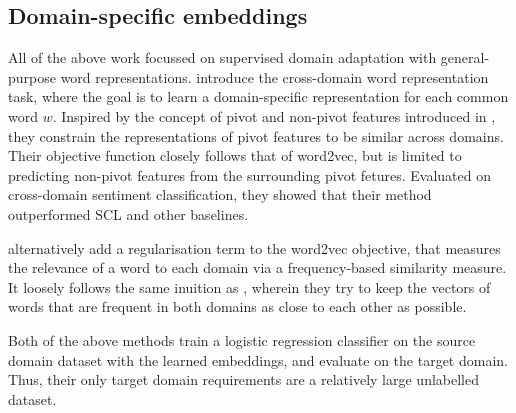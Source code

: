 \documentclass[12pt]{report}
\begin{document}
	\subsection{Domain-specific embeddings}
	All of the above work focussed on supervised domain adaptation with general-purpose word representations. \citep{bollegala2015unsupervised} introduce the cross-domain word representation task, where the goal is to learn a domain-specific representation for each common word $w$. Inspired by the concept of pivot and non-pivot features introduced in \citep{blitzer2006domain}, they constrain the representations of pivot features to be similar across domains. Their objective function closely follows that of word2vec, but is limited to predicting non-pivot features from the surrounding pivot fetures. Evaluated on cross-domain sentiment classification, they showed that their method outperformed SCL and other baselines. 
	\par \citep{yang2017simple} alternatively add a regularisation term to  the word2vec objective, that measures the relevance of a word to each domain via a frequency-based similarity measure. It loosely follows the same inuition as \citep{bollegala2015unsupervised}, wherein they try to keep the vectors of words that are frequent in both domains as close to each other as possible. 
    \par Both of the above methods train a logistic regression classifier on the source domain dataset with the learned embeddings, and evaluate on the target domain. Thus, their only target domain requirements are a relatively large unlabelled dataset.
	
\end{document}
